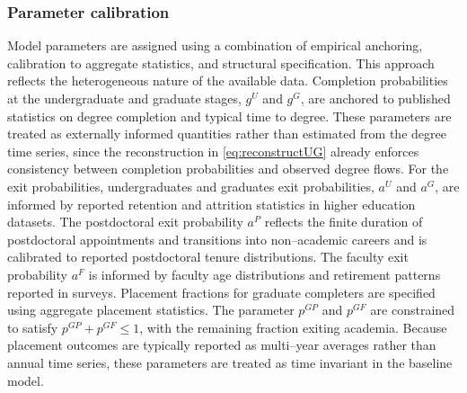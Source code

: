 \documentclass[3p]{elsarticle}%
\theoremstyle{definition}
\begin{document}
\subsubsection{Parameter calibration}
 \noindent Model parameters are assigned using a combination of empirical anchoring, calibration to aggregate statistics, and structural specification. This approach reflects the heterogeneous nature of the available data. Completion probabilities at the undergraduate and graduate stages, $g^U$ and $g^G$, are anchored to published statistics on degree completion and typical time to degree. These parameters are treated as externally informed quantities rather than estimated from the degree time series, since the reconstruction in \eqref{eq:reconstructUG} already enforces consistency between completion probabilities and observed degree flows. For the exit probabilities, undergraduates and graduates exit probabilities, $a^U$ and $a^G$, are informed by reported retention and attrition statistics in higher education datasets. The postdoctoral exit probability $a^P$ reflects the finite duration of postdoctoral appointments and transitions into non--academic careers and is calibrated to reported postdoctoral tenure distributions. The faculty exit probability $a^F$ is informed by faculty age distributions and retirement patterns reported in surveys. Placement fractions for graduate completers are specified using aggregate placement statistics. The parameter $p^{GP}$ and $p^{GF}$ are constrained to satisfy $p^{GP}+p^{GF}\leq 1$, with the remaining fraction exiting academia. Because placement outcomes are typically reported as multi--year averages rather than annual time series, these parameters are treated as time invariant in the baseline model.\\
 
\end{document}
